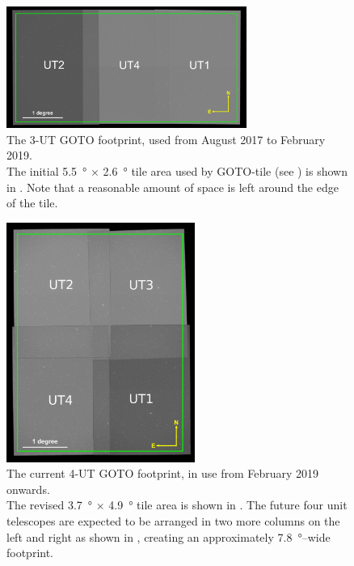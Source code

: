 \begin{colsection}
\begin{colsection}
\begin{figure}[p]
    \begin{center}
        \includegraphics[width=0.7\textwidth]{images/footprint_1_box.png}
    \end{center}
    \caption[The previous 3-UT GOTO footprint]{
        The 3-UT GOTO footprint, used from August 2017 to February 2019. \\
        The initial \SI{5.5}{\degree} $\times$ \SI{2.6}{\degree} tile area used by GOTO-tile (see ) is shown in . Note that a reasonable amount of space is left around the edge of the tile.
    }\label{fig:3ut_footprint}
\end{figure}

\begin{figure}[p]
    \begin{center}
        \includegraphics[width=0.55\textwidth]{images/footprint_2_box.png}
    \end{center}
    \caption[The current 4-UT GOTO footprint]{
        The current 4-UT GOTO footprint, in use from February 2019 onwards. \\
        The revised \SI{3.7}{\degree} $\times$ \SI{4.9}{\degree} tile area is shown in . The future four unit telescopes are expected to be arranged in two more columns on the left and right as shown in , creating an approximately \SI{7.8}{\degree}--wide footprint.
    }\label{fig:4ut_footprint}
\end{figure}


\end{colsection}
\end{colsection}
